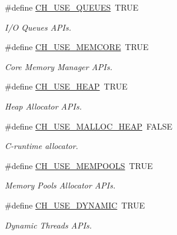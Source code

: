 \begin{DoxyCompactItemize}
\#define \hyperlink{group__config_gaabe4bd52d2fd1b180ebba1d1e8243051}{C\+H\+\_\+\+U\+S\+E\+\_\+\+Q\+U\+E\+U\+E\+S}~T\+R\+U\+E
\begin{DoxyCompactList}\small\item\em I/\+O Queues A\+P\+Is. \end{DoxyCompactList}\item 
\#define \hyperlink{group__config_gaff85f4d919dac30a337ce2f34e2fa1af}{C\+H\+\_\+\+U\+S\+E\+\_\+\+M\+E\+M\+C\+O\+R\+E}~T\+R\+U\+E
\begin{DoxyCompactList}\small\item\em Core Memory Manager A\+P\+Is. \end{DoxyCompactList}\item 
\#define \hyperlink{group__config_gaaeb266ab6131572f1d8f164bddf2da3f}{C\+H\+\_\+\+U\+S\+E\+\_\+\+H\+E\+A\+P}~T\+R\+U\+E
\begin{DoxyCompactList}\small\item\em Heap Allocator A\+P\+Is. \end{DoxyCompactList}\item 
\#define \hyperlink{group__config_ga4785d390f3a787916c5a5c41e953577d}{C\+H\+\_\+\+U\+S\+E\+\_\+\+M\+A\+L\+L\+O\+C\+\_\+\+H\+E\+A\+P}~F\+A\+L\+S\+E
\begin{DoxyCompactList}\small\item\em C-\/runtime allocator. \end{DoxyCompactList}\item 
\#define \hyperlink{group__config_gac456517b37f104d2226fef50310c79f8}{C\+H\+\_\+\+U\+S\+E\+\_\+\+M\+E\+M\+P\+O\+O\+L\+S}~T\+R\+U\+E
\begin{DoxyCompactList}\small\item\em Memory Pools Allocator A\+P\+Is. \end{DoxyCompactList}\item 
\#define \hyperlink{group__config_gaae4996e24bbee7d66528671cec8b8749}{C\+H\+\_\+\+U\+S\+E\+\_\+\+D\+Y\+N\+A\+M\+I\+C}~T\+R\+U\+E
\begin{DoxyCompactList}\small\item\em Dynamic Threads A\+P\+Is. \end{DoxyCompactList}\end{DoxyCompactItemize}
